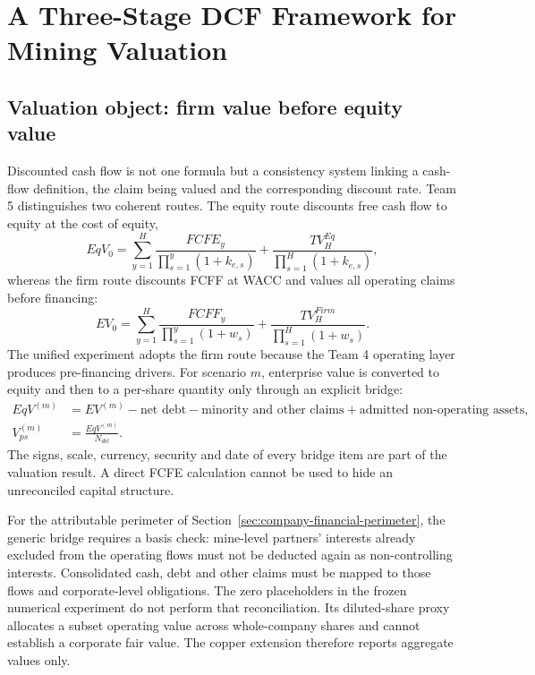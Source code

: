 \chapter{A Three-Stage DCF Framework for Mining Valuation}

\section{Valuation object: firm value before equity value}

Discounted cash flow is not one formula but a consistency system linking a
cash-flow definition, the claim being valued and the corresponding discount
rate. Team 5 distinguishes two coherent routes. The equity route discounts
free cash flow to equity at the cost of equity,
\begin{equation}
EqV_0=\sum_{y=1}^{H}\frac{FCFE_y}{\prod_{s=1}^{y}(1+k_{e,s})}
      +\frac{TV_H^{Eq}}{\prod_{s=1}^{H}(1+k_{e,s})},
\end{equation}
whereas the firm route discounts FCFF at WACC and values all operating claims
before financing:
\begin{equation}
EV_0=\sum_{y=1}^{H}\frac{FCFF_y}{\prod_{s=1}^{y}(1+w_s)}
     +\frac{TV_H^{Firm}}{\prod_{s=1}^{H}(1+w_s)}.
\end{equation}
The unified experiment adopts the firm route because the Team 4 operating
layer produces pre-financing drivers. For scenario \(m\), enterprise value is
converted to equity and then to a per-share quantity only through an explicit
bridge:
\begin{align}
EqV^{(m)}
  &=EV^{(m)}-\text{net debt}-\text{minority and other claims}
    +\text{admitted non-operating assets},\\
V_{ps}^{(m)}&=\frac{EqV^{(m)}}{N_{dil}}.
\end{align}
The signs, scale, currency, security and date of every bridge item are part of
the valuation result. A direct FCFE calculation cannot be used to hide an
unreconciled capital structure.

For the attributable perimeter of Section~\ref{sec:company-financial-perimeter},
the generic bridge requires a basis check: mine-level partners' interests
already excluded from the operating flows must not be deducted again as
non-controlling interests. Consolidated cash, debt and other claims must be
mapped to those flows and corporate-level obligations. The zero placeholders
in the frozen numerical experiment do not perform that reconciliation.
Its diluted-share proxy allocates a subset operating value across whole-company
shares and cannot establish a corporate fair value. The copper extension
therefore reports aggregate values only.

